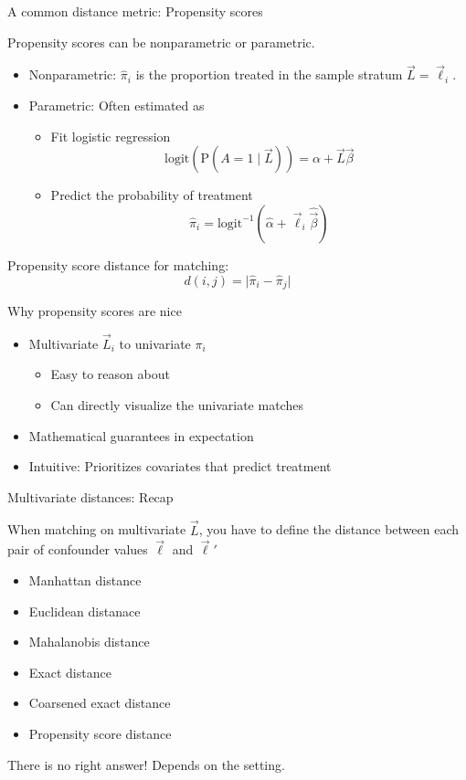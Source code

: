 \documentclass{beamer}
\renewcommand\P{\text{P}}
\begin{document}
\begin{frame}{A common distance metric: Propensity scores}

Propensity scores can be nonparametric or parametric.
\begin{itemize} \pause
\item Nonparametric: $\hat\pi_i$ is the proportion treated in the sample stratum $\vec{L} = \vec\ell_i$. \pause
\item Parametric: Often estimated as
\begin{itemize}
\item Fit logistic regression
$$\text{logit}\left(\P(A = 1\mid \vec{L})\right) = \alpha + \vec{L}\vec\beta$$ \pause
\item Predict the probability of treatment
$$\hat\pi_i = \text{logit}^{-1}\left(\hat\alpha + \vec\ell_i\hat{\vec\beta}\right)$$ \vspace{-.2in}
\end{itemize}
\end{itemize} \pause
Propensity score distance for matching:
$$d(i,j) = \lvert \hat\pi_i - \hat\pi_j\rvert $$

\end{frame}

\begin{frame}{Why propensity scores are nice} \pause

\begin{itemize}
\item Multivariate $\vec{L}_i$ to univariate $\pi_i$ \pause
\begin{itemize}
\item Easy to reason about \pause
\item Can directly visualize the univariate matches
\end{itemize} \pause
\item Mathematical guarantees in expectation \pause
\item Intuitive: Prioritizes covariates that predict treatment
\end{itemize}

\end{frame}

\begin{frame}{Multivariate distances: Recap}

When matching on multivariate $\vec{L}$, you have to define the distance between each pair of confounder values $\vec\ell$ and $\vec\ell'$
\begin{itemize}
\item Manhattan distance
\item Euclidean distanace
\item Mahalanobis distance
\item Exact distance
\item Coarsened exact distance
\item Propensity score distance
\end{itemize}
There is no right answer! Depends on the setting.

\end{frame}
\end{document}
